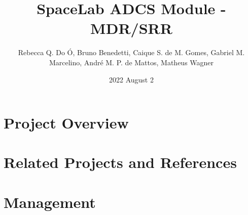 \documentclass{beamer}
\title[Presentation]{SpaceLab ADCS Module - MDR/SRR}
\author[SpaceLab]{Rebecca Q. Do Ó, Bruno Benedetti, Caique S. de M. Gomes, Gabriel M. Marcelino, André M. P. de Mattos, Matheus Wagner}
\institute[]{SpaceLab - UFSC}
\date{2022 August 2}
\begin{document}
    
    

    \section{Project Overview}

        

    \section{Related Projects and References}

        

    \section{Management}

        

\end{document}
